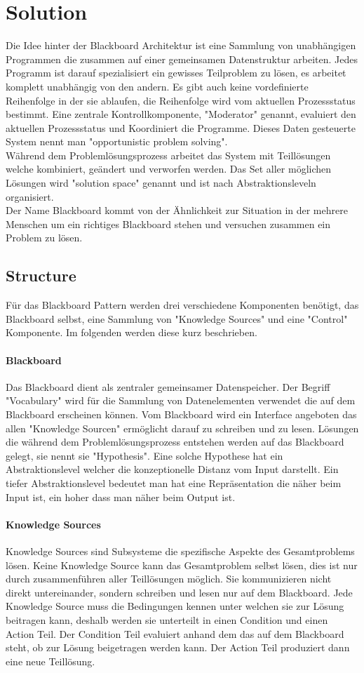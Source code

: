 \section{Solution}
Die Idee hinter der Blackboard Architektur ist eine Sammlung von unabhängigen Programmen die zusammen auf einer gemeinsamen Datenstruktur arbeiten. Jedes Programm ist darauf spezialisiert ein gewisses Teilproblem zu lösen, es arbeitet komplett unabhängig von den andern. Es gibt auch keine vordefinierte Reihenfolge in der sie ablaufen, die Reihenfolge wird vom aktuellen Prozessstatus bestimmt. Eine zentrale Kontrollkomponente, "Moderator" genannt, evaluiert den aktuellen Prozessstatus und Koordiniert die Programme. Dieses Daten gesteuerte System nennt man "opportunistic problem solving".\\
Während dem Problemlösungsprozess arbeitet das System mit Teillösungen welche kombiniert, geändert und verworfen werden. Das Set aller möglichen Lösungen wird "solution space" genannt und ist nach Abstraktionsleveln organisiert.\\
Der Name Blackboard kommt von der Ähnlichkeit zur Situation in der mehrere Menschen um ein richtiges Blackboard stehen und versuchen zusammen ein Problem zu lösen.

\subsection{Structure}
Für das Blackboard Pattern werden drei verschiedene Komponenten benötigt, das Blackboard selbst, eine Sammlung von "Knowledge Sources" und eine "Control" Komponente. Im folgenden werden diese kurz beschrieben.
\paragraph{Blackboard}
Das Blackboard dient als zentraler gemeinsamer Datenspeicher. Der Begriff "Vocabulary" wird für die Sammlung von Datenelementen verwendet die auf dem Blackboard erscheinen können. Vom Blackboard wird ein Interface angeboten das allen "Knowledge Sourcen" ermöglicht darauf zu schreiben und zu lesen. Lösungen die während dem Problemlösungsprozess entstehen werden auf das Blackboard gelegt, sie nennt sie "Hypothesis". Eine solche Hypothese hat ein Abstraktionslevel welcher die konzeptionelle Distanz vom Input darstellt. Ein tiefer Abstraktionslevel bedeutet man hat eine Repräsentation die näher beim Input ist, ein hoher dass man näher beim Output ist.
\paragraph{Knowledge Sources}
Knowledge Sources sind Subsysteme die spezifische Aspekte des Gesamtproblems lösen. Keine Knowledge Source kann das Gesamtproblem selbst lösen, dies ist nur durch zusammenführen aller Teillösungen möglich. Sie kommunizieren nicht direkt untereinander, sondern schreiben und lesen nur auf dem Blackboard. Jede Knowledge Source muss die Bedingungen kennen unter welchen sie zur Lösung beitragen kann, deshalb werden sie unterteilt in einen Condition und einen Action Teil. Der Condition Teil evaluiert anhand dem das auf dem Blackboard steht, ob zur Lösung beigetragen werden kann. Der Action Teil produziert dann eine neue Teillösung.

